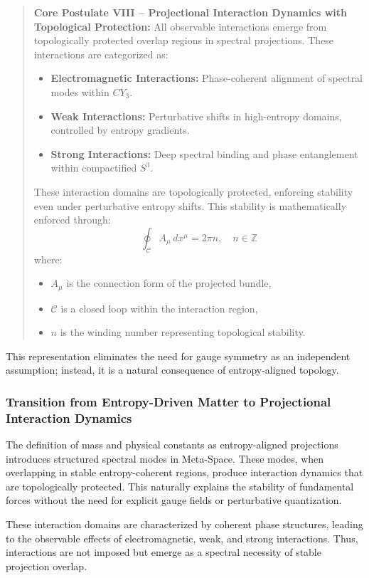 \documentclass[10.5pt,a4paper]{article}
\begin{document}
\begin{quote}
\textbf{Core Postulate VIII – Projectional Interaction Dynamics with Topological Protection:}  
All observable interactions emerge from topologically protected overlap regions in spectral projections. These interactions are categorized as:
\begin{itemize}
    \item \textbf{Electromagnetic Interactions:} Phase-coherent alignment of spectral modes within \(CY_3\).
    \item \textbf{Weak Interactions:} Perturbative shifts in high-entropy domains, controlled by entropy gradients.
    \item \textbf{Strong Interactions:} Deep spectral binding and phase entanglement within compactified \(S^3\).
\end{itemize}
These interaction domains are topologically protected, enforcing stability even under perturbative entropy shifts. This stability is mathematically enforced through:
\[
\oint_{\mathcal{C}} A_\mu \, dx^\mu = 2\pi n, \quad n \in \mathbb{Z}
\]
where:
\begin{itemize}
    \item \(A_\mu\) is the connection form of the projected bundle,
    \item \(\mathcal{C}\) is a closed loop within the interaction region,
    \item \(n\) is the winding number representing topological stability.
\end{itemize}
\end{quote}

This representation eliminates the need for gauge symmetry as an independent assumption; instead, it is a natural consequence of entropy-aligned topology.

\subsubsection*{Transition from Entropy-Driven Matter to Projectional Interaction Dynamics}

The definition of mass and physical constants as entropy-aligned projections introduces structured spectral modes in Meta-Space. These modes, when overlapping in stable entropy-coherent regions, produce interaction dynamics that are topologically protected. This naturally explains the stability of fundamental forces without the need for explicit gauge fields or perturbative quantization.

These interaction domains are characterized by coherent phase structures, leading to the observable effects of electromagnetic, weak, and strong interactions. Thus, interactions are not imposed but emerge as a spectral necessity of stable projection overlap.
\end{document}
